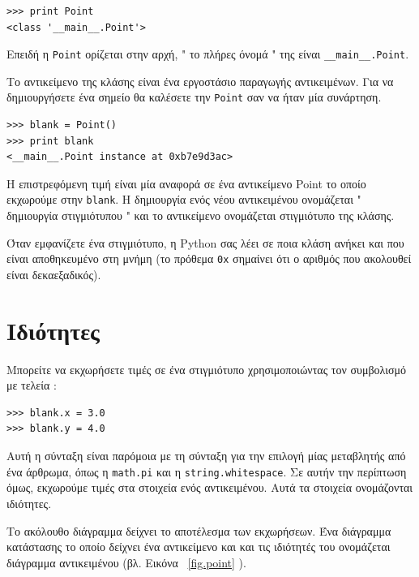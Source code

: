 \documentclass[10pt]{book}
\begin{document}
\begin{verbatim}
>>> print Point
<class '__main__.Point'>
\end{verbatim}
%
 Επειδή η  {\tt Point}  ορίζεται στην αρχή,  " το πλήρες όνομά "  της είναι  \verb"__main__.Point".

 Το αντικείμενο της κλάσης είναι ένα εργοστάσιο παραγωγής αντικειμένων. Για να δημιουργήσετε ένα σημείο θα καλέσετε την  {\tt Point}  σαν να ήταν μία συνάρτηση. 

\begin{verbatim}
>>> blank = Point()
>>> print blank
<__main__.Point instance at 0xb7e9d3ac>
\end{verbatim}
%
 Η επιστρεφόμενη τιμή είναι μία αναφορά σε ένα αντικείμενο  Point  το οποίο εκχωρούμε στην  {\tt blank}.  Η δημιουργία ενός νέου αντικειμένου ονομάζεται  " δημιουργία στιγμιότυπου "  και το αντικείμενο ονομάζεται στιγμιότυπο της κλάσης.

Όταν εμφανίζετε ένα στιγμιότυπο, η  Python  σας λέει σε ποια κλάση ανήκει και που είναι αποθηκευμένο στη μνήμη (το πρόθεμα  {\tt 0x}  σημαίνει ότι ο αριθμός που ακολουθεί είναι δεκαεξαδικός).


\section{Ιδιότητες}
\label{attributes}

Μπορείτε να εκχωρήσετε τιμές σε ένα στιγμιότυπο χρησιμοποιώντας τον συμβολισμό με τελεία :

\begin{verbatim}
>>> blank.x = 3.0
>>> blank.y = 4.0
\end{verbatim}
%
 Αυτή η σύνταξη είναι παρόμοια με τη σύνταξη για την επιλογή μίας μεταβλητής από ένα άρθρωμα, όπως η  {\tt math.pi}  και η  {\tt string.whitespace}.  Σε αυτήν την περίπτωση όμως, εκχωρούμε τιμές στα στοιχεία ενός αντικειμένου. Αυτά τα στοιχεία ονομάζονται ιδιότητες.


Το ακόλουθο διάγραμμα δείχνει το αποτέλεσμα των εκχωρήσεων. Ένα διάγραμμα κατάστασης το οποίο δείχνει ένα αντικείμενο και και τις ιδιότητές του ονομάζεται διάγραμμα αντικειμένου (βλ. Εικόνα~ \ref{fig.point} ). 
\end{document}
